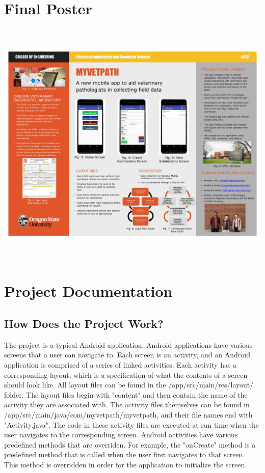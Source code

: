 \documentclass[onecolumn, draftclsnofoot,10pt, compsoc]{IEEEtran}
\begin{document}
 \section{Final Poster}
 \begin{center}
\includegraphics[height=12cm]{group72_poster_48x36.jpg}
\end{center}
 
 \section{Project Documentation}
 \subsection{How Does the Project Work?}
 The project is a typical Android application. Android applications have various screens that a user can navigate to. Each screen is an activity, and an Android application is comprised of a series of linked activities. Each activity has a corresponding layout, which is a specification of what the contents of a screen should look like. All layout files can be found in the /app/src/main/res/layout/ folder. The layout files begin with "content" and then contain the name of the activity they are associated with. The activity files themselves can be found in /app/src/main/java/com/myvetpath/myvetpath, and their file names end with "Activity.java". The code in these activity files are executed at run time when the user navigates to the corresponding screen. Android activities have various predefined methods that are overriden. For example, the "onCreate" method is a predefined method that is called when the user first navigates to that screen. This method is overridden in order for the application to initialize the screen.
  
\end{document}
